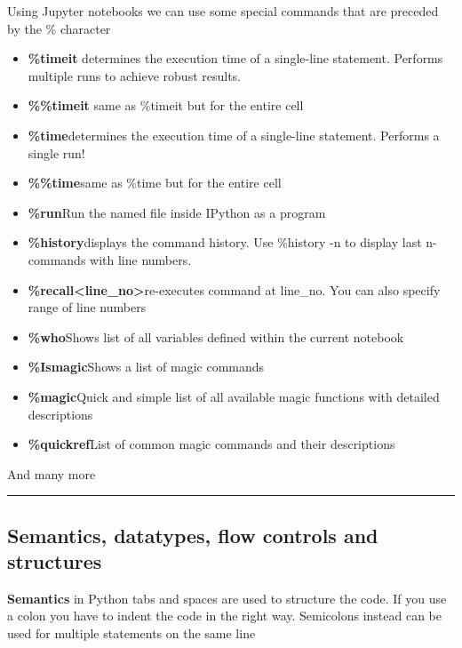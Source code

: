 Using Jupyter notebooks we can use some special commands that are preceded by the \% character
\begin{itemize}
    \item \textbf{\%timeit} \ra determines the execution time of a single-line
statement. Performs multiple runs to achieve robust results.
    \item \textbf{\%\%timeit} \ra same as \%timeit but for the entire cell
    \item \textbf{\%time}\ra determines the execution time of a single-line
statement. Performs a single run!
    \item \textbf{\%\%time}\ra same as \%time but for the entire cell
    \item \textbf{\%run}\ra Run the named file inside IPython as a program
    \item \textbf{\%history}\ra displays the command history. Use \%history -n to display last n-commands with line
numbers.
    \item \textbf{\%recall<line\_no>}\ra  re-executes command at line\_no. You can also specify range of line numbers
    \item \textbf{\%who}\ra Shows list of all variables defined within the current notebook
    \item \textbf{\%Ismagic}\ra Shows a list of magic commands
    \item \textbf{\%magic}\ra Quick and simple list of all available magic functions with detailed descriptions
    \item \textbf{\%quickref}\ra List of common magic commands and their descriptions
\end{itemize}

And many more

\vspace{10pt}

\hrule

\subsection{Semantics, datatypes, flow controls and structures}

\vspace{10pt}

\textbf{Semantics} \ra in Python tabs and spaces are used to structure the code. If you use a colon you have to indent the code in the right way. Semicolons instead can be used for multiple statements on the same line

\vspace{10pt}

